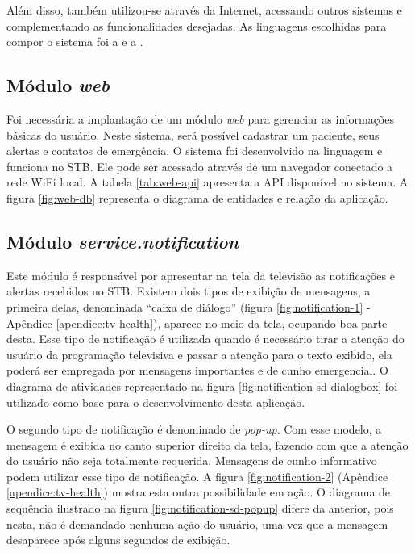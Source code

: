 Além disso, também utilizou-se \webservices[] através da Internet, acessando
outros sistemas e complementando as funcionalidades desejadas. As linguagens
escolhidas para compor o sistema foi a \python[] e a \shell.

\subsection{Módulo \textit{web}}

Foi necessária a implantação de um módulo \textit{web} para gerenciar as 
informações básicas do usuário. Neste sistema, será possível cadastrar um 
paciente, seus alertas e contatos de emergência. O sistema foi desenvolvido
na linguagem \python[] e funciona no STB. Ele pode ser acessado através de
um navegador conectado a rede WiFi local. A tabela \ref{tab:web-api} apresenta
a API disponível no sistema. A figura \vref{fig:web-db} representa o diagrama
de entidades e relação da aplicação.


\subsection{Módulo \textit{service.notification}}\label{subsubsec:notification}

Este módulo é responsável por apresentar na tela da televisão as notificações e
alertas recebidos no STB. Existem dois tipos de exibição de mensagens, a
primeira delas, denominada ``caixa de diálogo'' (figura
\vref{fig:notification-1} - Apêndice \ref{apendice:tv-health}), 
aparece no meio da tela, ocupando boa parte desta.
Esse tipo de notificação é utilizada quando é necessário tirar a atenção do
usuário da programação televisiva e passar a atenção para o texto exibido,
ela poderá ser empregada por mensagens importantes e de cunho emergencial.
O diagrama de atividades representado na figura
\ref{fig:notification-sd-dialogbox} foi utilizado como base para o
desenvolvimento desta aplicação.



O segundo tipo de notificação é denominado de \textit{pop-up}. Com esse modelo,
a mensagem é exibida no canto superior direito da tela, fazendo com que a
atenção do usuário não seja totalmente requerida. Mensagens de cunho informativo
podem utilizar esse tipo de notificação. A figura \ref{fig:notification-2} 
(Apêndice \ref{apendice:tv-health}) mostra esta outra possibilidade em ação.
O diagrama de sequência ilustrado na figura \ref{fig:notification-sd-popup}
difere da anterior, pois nesta, não é demandado nenhuma
ação do usuário, uma vez que a mensagem desaparece após alguns segundos de exibição.

